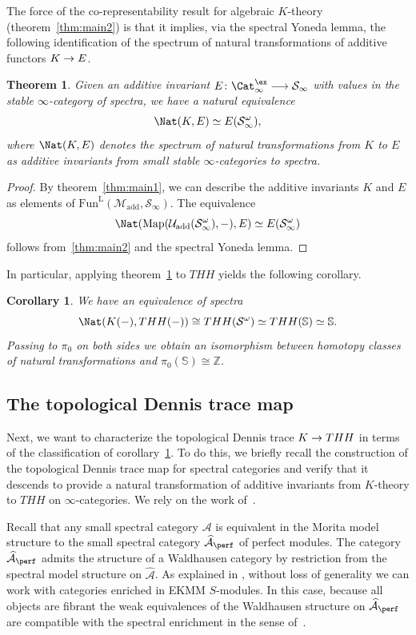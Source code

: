 \documentclass{amsart}
\newcommand{\htp}{\simeq}
\renewcommand{\to}{\mathchoice{\longrightarrow}{\rightarrow}{\rightarrow}{\rightarrow}}
\newcommand{\cM}{{\mathcal M}}
\newcommand{\cS}{{\mathcal S}}
\newcommand{\cU}{{\mathcal U}}
\let\catsymbfont\mathcal
\newcommand{\aA}{{\catsymbfont{A}}}
\newcommand{\aS}{{\catsymbfont{S}}}
\renewcommand{\L}{\mathrm{L}}
\newcommand{\bZ}{{\mathbb{Z}}}
\newcommand{\stabcat}{\Cat_\i^{\ex}}
\newcommand{\Fun}{\mathrm{Fun}} %
\newcommand{\Map}{\mathrm{Map}}%
\newcommand{\bbS}{\mathbb{S}}
\newcommand{\ispec}{\aS_{\infty}}
\newcommand{\too}{\longrightarrow}%
\renewcommand{\i}{\infty}
\newcommand{\Motadd}{\cM_{\mathrm{add}}}
\newcommand{\Umot}{\cU_{\mathrm{add}}}
\numberwithin{equation}{section}
\newtheorem{theorem}[equation]{Theorem}
\newtheorem{corollary}[equation]{Corollary}
\theoremstyle{definition}
\begin{document}
The force of the co-representability result for algebraic $K$-theory
(theorem~\ref{thm:main2}) is that it implies, via the spectral Yoneda
lemma, the following identification of the spectrum of natural
transformations of additive functors $K \to E$.

\begin{theorem}\label{thm:nats}
Given an additive invariant $E \colon \stabcat \too \ispec$ with values in the stable $\i$-category of spectra, we have a natural equivalence
\[
\Nat(K,E) \simeq E(\ispec^{\omega}),
\]
where $\Nat(K,E)$ denotes the spectrum of natural transformations from
$K$ to $E$ as additive invariants from small stable $\i$-categories to
spectra.
\end{theorem}

\begin{proof}
By theorem~\ref{thm:main1}, we can describe the additive invariants
$K$ and $E$ as elements of $\Fun^{\L}(\Motadd, \ispec)$.
The equivalence 
\[
\Nat(\Map(\Umot(\ispec^{\omega}),-), E) \htp E(\ispec^{\omega})
\]
follows from~\ref{thm:main2} and the spectral Yoneda lemma.
\end{proof}

In particular, applying theorem~\ref{thm:nats} to $THH$ yields the
following corollary.

\begin{corollary}\label{cor:kthh}
We have an equivalence of spectra
\[
\Nat(K(-),THH(-)) \cong THH(\cS^{\omega}) \htp THH(\bbS) \htp \bbS.
\]
Passing to $\pi_0$ on both sides we obtain an isomorphism between
homotopy classes of natural transformations and
$\pi_0(\bbS) \cong \bZ$.
\end{corollary}

\subsection{The topological Dennis trace map}
Next, we want to characterize the topological Dennis trace $K \to THH$
in terms of the classification of corollary~\ref{cor:kthh}.  To do
this, we briefly recall the construction of the topological Dennis
trace map for spectral categories and verify that it descends to
provide a natural transformation of additive invariants from
$K$-theory to $THH$ on $\i$-categories.  We rely on the work
of~\cite[\S 5]{BM}.

Recall that any small spectral category $\aA$ is equivalent in the
Morita model structure to the small spectral category
$\widehat{\aA}_{\perf}$ of perfect modules.  The category
$\widehat{\aA}_{\perf}$ admits the structure of a Waldhausen category
by restriction from the spectral model structure on $\widehat{\aA}$.
As explained in \cite[\S 15]{BM}, without loss of generality we can
work with categories enriched in EKMM $S$-modules.  In this case,
because all objects are fibrant the weak equivalences of the
Waldhausen structure on $\widehat{\aA}_{\perf}$ are compatible with
the spectral enrichment in the sense of~\cite[\S 1]{BM2}.
\end{document}
